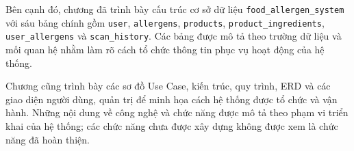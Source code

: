 Bên cạnh đó, chương đã trình bày cấu trúc cơ sở dữ liệu \texttt{food\_allergen\_system} với sáu bảng chính gồm \texttt{user}, \texttt{allergens}, \texttt{products}, \texttt{product\_ingredients}, \texttt{user\_allergens} và \texttt{scan\_history}. Các bảng được mô tả theo trường dữ liệu và mối quan hệ nhằm làm rõ cách tổ chức thông tin phục vụ hoạt động của hệ thống.

Chương cũng trình bày các sơ đồ Use Case, kiến trúc, quy trình, ERD và các giao diện người dùng, quản trị để minh họa cách hệ thống được tổ chức và vận hành. Những nội dung về công nghệ và chức năng được mô tả theo phạm vi triển khai của hệ thống; các chức năng chưa được xây dựng không được xem là chức năng đã hoàn thiện.
